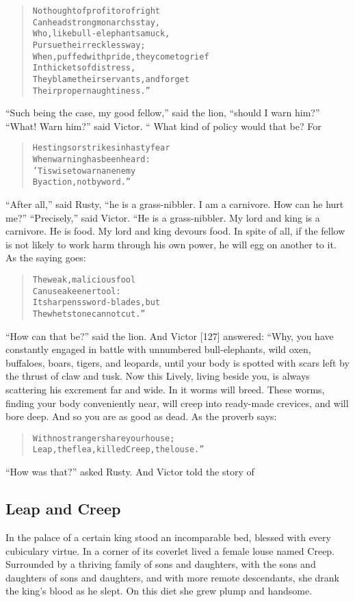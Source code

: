 \documentclass[article, twoside, 14pt]{memoir}
\renewenvironment{verbatim}{%
\begin{quote}%
\vskip -10pt%
\begin{alltt}\normalfont\large}{\end{alltt}%
\end{quote}%
\vskip -10pt
} %
\begin{document}
\begin{verbatim}
No thought of profit or of right
    Can headstrong monarchs stay,
Who, like bull-elephants amuck,
    Pursue their reckless way;
When, puffed with pride, they come to grief
    In thickets of distress,
They blame their servants, and forget
    Their proper naughtiness.”
\end{verbatim}
``Such being the case, my good fellow,'' said the lion,
``should I warn him?'' ``What! Warn him?'' said Victor. “ What kind
of policy would that be? For

\begin{verbatim}
He stings or strikes in hasty fear
    When warning has been heard:
'Tis wise to warn an enemy
    By action, not by word.”
\end{verbatim}
``After all,'' said Rusty,
``he is a grass-nibbler. I am a carnivore. How can he hurt me?''
``Precisely,'' said Victor. “He is a grass-nibbler. My lord and
king is a carnivore. He is food. My lord and king devours food. In
spite of all, if the fellow is not likely to work harm through his
own power, he will egg on another to it. As the saying goes:

\begin{verbatim}
The weak, malicious fool
Can use a keener tool:
It sharpens sword-blades, but
The whetstone cannot cut.”
\end{verbatim}
``How can that be?'' said the lion. And Victor [127] answered:
“Why, you have constantly engaged in battle with unnumbered
bull-elephants, wild oxen, buffaloes, boars, tigers, and leopards,
until your body is spotted with scars left by the thrust of claw
and tusk. Now this Lively, living beside you, is always scattering
his excrement far and wide. In it worms will breed. These worms,
finding your body conveniently near, will creep into ready-made
crevices, and will bore deep. And so you are as good as dead. As
the proverb says:

\begin{verbatim}
With no stranger share your house;
Leap, the flea, killed Creep, the louse.”
\end{verbatim}
``How was that?'' asked Rusty. And Victor told the story of

\subsection{Leap and Creep}

\label{s13}

In the palace of a certain king stood an incomparable bed, blessed
with every cubiculary virtue. In a corner of its coverlet lived a
female louse named Creep. Surrounded by a thriving family of sons
and daughters, with the sons and daughters of sons and daughters,
and with more remote descendants, she drank the king's blood as he
slept. On this diet she grew plump and handsome.
\end{document}
